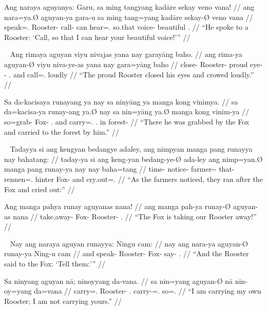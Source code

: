 \a\begingl
	\gla Ang naraya aguyanya: Garu, sa ming tangyang kadāre sekay veno vana! //
	\glb ang nara=ya.Ø aguyan-ya gara-u sa ming tang=yang kadāre sekay-Ø veno vana //
	\glc \AgtT{} speak=\TsgM{}.\Top{} Rooster-\Loc{} call-\Imp{} \PatT{} can hear=\Fsg{}.\Aarg{} so.that voice-\Top{} beautiful \Second{}.\Gen{} //
	\glft \enquote{He spoke to a Rooster: \enquote{Call, so that I can hear your beautiful voice!}} //
\endgl

\xe

\pex~ %
\a\begingl
	\gla Ang rimaya aguyan viyu nivajas yana nay garayāng baho. //
	\glb ang rima-ya aguyan-Ø viyu niva-ye-as yana nay gara=yāng baho //
	\glc \AgtT{} close-\TsgM{} Rooster-\Top{} proud eye-\Pl{}-\Parg{} \TsgM{}.\Gen{} and call=\TsgM{}.\Aarg{} loudly //
	\glft \enquote{The proud Rooster closed his eyes and crowed loudly.} //
\endgl

\a\begingl
	\gla Sa da-kacisaya runayang ya nay sa ninyāng ya manga kong vinimya. //
	\glb sa da=kacisa-ya runay-ang ya.Ø nay sa nin=yāng ya.Ø manga kong vinim-ya //
	\glc \PatT{} so=grab-\TsgM{} Fox-\Aarg{} \TsgM{}.\Top{} and \PatT{} carry=\TsgM{}.\Aarg{} \TsgM{}.\Top{} \Dyn{} in forest-\Loc{} //
	\glft \enquote{There he was grabbed by the Fox and carried to the forest by him.} //
\endgl

\xe

\pex~ %
\a\begingl
	\gla Tadayya si ang kengyan bedangye adaley, ang nimpyan manga pang runayya nay bahatang: //
	\glb taday-ya si ang keng-yan bedang-ye-Ø ada-ley ang nimp=yan.Ø manga pang runay-ya nay nay baha=tang //
	\glc time-\Loc{} \Rel{} \AgtT{} notice-\TplM{} farmer-\Pl{}-\Top{} that-\PargI{} \AgtT{} rennen=\TplM{}.\Top{} \Dyn{} hinter Fox-\Loc{} and cry.out=\TplM{}.\Aarg{} //
	\glft \enquote{As the farmers noticed, they ran after the Fox and cried out:} //
\endgl

\a\begingl
	\gla Ang manga pahya runay aguyanas nana! //
	\glb ang manga pah-ya runay-Ø aguyan-as nana //
	\glc \AgtT{} \Prog{} take.away-\TsgM{} Fox-\Top{} Rooster-\Parg{} \Fsg{}.\Gen{} //
	\glft \enquote{The Fox is taking our Rooster away!} //
\endgl

\xe

\pex~ %
\a\begingl
	\gla Nay ang naraya aguyan runayya: Ningu cam: //
	\glb nay ang nara-ya aguyan-Ø runay-ya Ning-u cam //
	\glc and \AgtT{} speak-\TsgM{} Rooster-\Top{} Fox-\Loc{} say-\Imp{} \TplM{}.\Dat{} //
	\glft \enquote{And the Rooster said to the Fox: \enquote{Tell them:}} //
\endgl

\a\label{ex:negativbindung}\begingl
	\gla Sa ninyang aguyan nā; ninoyyang da-vana. //
	\glb sa nin=yang aguyan-Ø nā nin-oy=yang da=vana //
	\glc \PatT{} carry=\Fsg{}.\Aarg{} Rooster-\Top{} \Fsg{}.\Gen{} carry-\Neg{}=\Fsg{}.\Aarg{} so=\Spl{}.\Gen{} //
	\glft \enquote{I am carrying my own Rooster; I am not carrying yours.} //
\endgl

